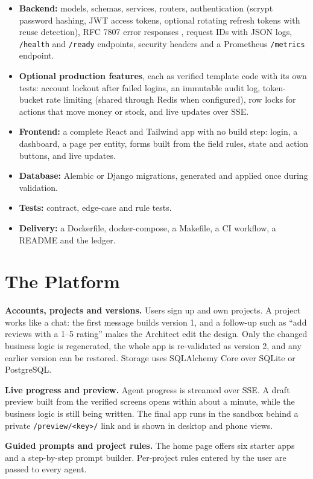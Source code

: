 \documentclass[12pt,a4paper]{report}
\begin{document}
\begin{itemize}
    \item \textbf{Backend:} models, schemas, services, routers, authentication (scrypt password hashing, JWT access tokens, optional rotating refresh tokens with reuse detection), RFC 7807 error responses \cite{rfc7807}, request IDs with JSON logs, \texttt{/health} and \texttt{/ready} endpoints, security headers and a Prometheus \texttt{/metrics} endpoint.
    \item \textbf{Optional production features}, each as verified template code with its own tests: account lockout after failed logins, an immutable audit log, token-bucket rate limiting (shared through Redis when configured), row locks for actions that move money or stock, and live updates over SSE.
    \item \textbf{Frontend:} a complete React and Tailwind app with no build step: login, a dashboard, a page per entity, forms built from the field rules, state and action buttons, and live updates.
    \item \textbf{Database:} Alembic or Django migrations, generated and applied once during validation.
    \item \textbf{Tests:} contract, edge-case and rule tests.
    \item \textbf{Delivery:} a Dockerfile, docker-compose, a Makefile, a CI workflow, a README and the ledger.
\end{itemize}

\section{The Platform}

\textbf{Accounts, projects and versions.} Users sign up and own projects. A project works like a chat: the first message builds version 1, and a follow-up such as ``add reviews with a 1--5 rating'' makes the Architect edit the design. Only the changed business logic is regenerated, the whole app is re-validated as version 2, and any earlier version can be restored. Storage uses SQLAlchemy Core over SQLite or PostgreSQL.

\textbf{Live progress and preview.} Agent progress is streamed over SSE. A draft preview built from the verified screens opens within about a minute, while the business logic is still being written. The final app runs in the sandbox behind a private \texttt{/preview/<key>/} link and is shown in desktop and phone views.

\textbf{Guided prompts and project rules.} The home page offers six starter apps and a step-by-step prompt builder. Per-project rules entered by the user are passed to every agent.
\end{document}
